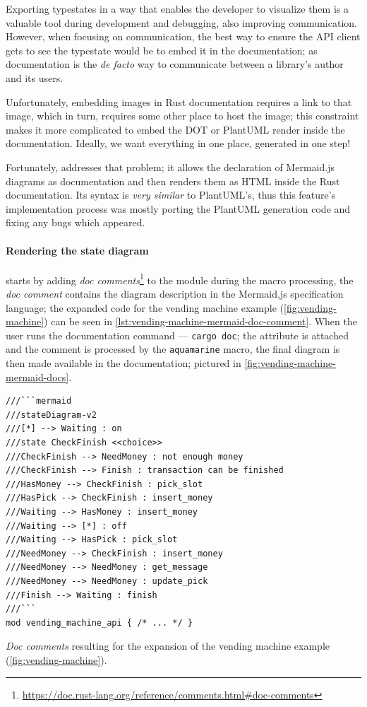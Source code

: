 Exporting typestates in a way that enables the developer to visualize them is a valuable tool during development and debugging, also improving communication.
However, when focusing on communication, the best way to ensure the \gls{API} client gets to see the typestate would be to embed it in the documentation;
as documentation is the \emph{de facto} way to communicate between a library's author and its users.

Unfortunately, embedding images in Rust documentation requires a link to that image, which in turn, requires some other place to host the image;
this constraint makes it more complicated to embed the DOT or PlantUML render inside the documentation.
Ideally, we want everything in one place, generated in one step!

Fortunately,  addresses that problem;
it allows the declaration of Mermaid.js diagrams as documentation and then renders them as HTML inside the Rust documentation.
Its syntax is \emph{very similar} to PlantUML's,
thus this feature's implementation process was mostly porting the PlantUML generation code and fixing any bugs which appeared.

\paragraph{Rendering the state diagram} starts by adding \emph{doc comments}\footnote{\url{https://doc.rust-lang.org/reference/comments.html\#doc-comments}}
to the module during the macro processing, the \emph{doc comment} contains the diagram description in the Mermaid.js specification language;
the expanded code for the vending machine example (\autoref{fig:vending-machine}) can be seen in \autoref{lst:vending-machine-mermaid-doc-comment}.
When the user runs the documentation command --- \texttt{cargo doc}; the  attribute is attached and
the comment is processed by the \texttt{aquamarine} macro, the final diagram is then made available in the documentation;
pictured in \autoref{fig:vending-machine-mermaid-docs}.

\begin{listing}
    \begin{verbatim}
///```mermaid
///stateDiagram-v2
///[*] --> Waiting : on
///state CheckFinish <<choice>>
///CheckFinish --> NeedMoney : not enough money
///CheckFinish --> Finish : transaction can be finished
///HasMoney --> CheckFinish : pick_slot
///HasPick --> CheckFinish : insert_money
///Waiting --> HasMoney : insert_money
///Waiting --> [*] : off
///Waiting --> HasPick : pick_slot
///NeedMoney --> CheckFinish : insert_money
///NeedMoney --> NeedMoney : get_message
///NeedMoney --> NeedMoney : update_pick
///Finish --> Waiting : finish
///```
mod vending_machine_api { /* ... */ }
    \end{verbatim}
    \caption{\emph{Doc comments} resulting for the expansion of the vending machine example (\autoref{fig:vending-machine}).}
    \label{lst:vending-machine-mermaid-doc-comment}
\end{listing}

